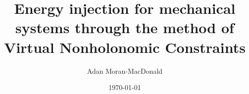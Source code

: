 

\title{Energy injection for mechanical systems through the method of Virtual Nonholonomic Constraints}
\author{Adan Moran-MacDonald }
\date{\today}

\maketitle


